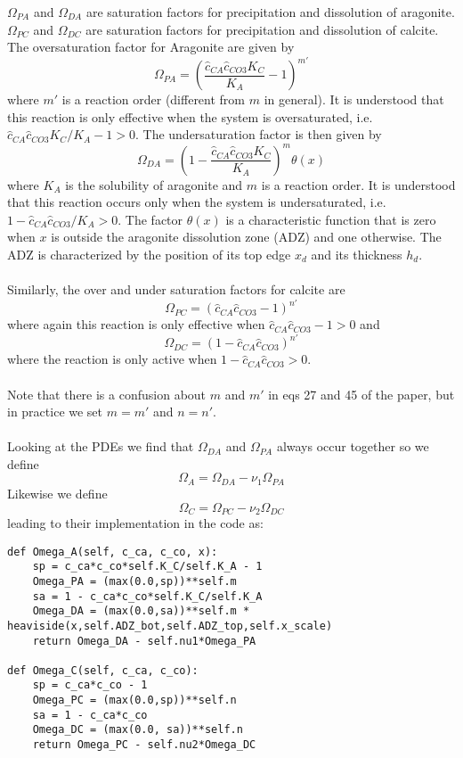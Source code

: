 \documentclass[a4paper]{article}
\begin{document}
$\Omega_{PA}$ and $\Omega_{DA}$ are saturation factors for precipitation and dissolution of aragonite. $\Omega_{PC}$ and $\Omega_{DC}$ are saturation factors for precipitation and dissolution of calcite.  The oversaturation factor for Aragonite are given by
\[
\Omega_{PA}=\left( \frac{\hat{c}_{CA} \hat{c}_{CO3} K_C}{K_A} -1 \right)^{m'}
\]
where $m'$ is a reaction order (different from $m$ in general).  It is understood that this reaction is only effective when the system is oversaturated, i.e. $\hat{c}_{CA} \hat{c}_{CO3} K_C/K_A -1 >0$.  The undersaturation factor is then given by
\[
\Omega_{DA}= \left(1-\frac{\hat{c}_{CA} \hat{c}_{CO3} K_C}{K_A}  \right)^m \theta(x)
\]
where $K_A$ is the solubility of aragonite and $m$ is a reaction order. It is understood that this reaction occurs only when the system is undersaturated, i.e. $1-\hat{c}_{CA} \hat{c}_{CO3}/K_A >0$.  The factor $\theta(x)$ is a characteristic function that is zero when $x$ is outside the aragonite dissolution zone (ADZ) and one otherwise. The ADZ is characterized by the position of its top edge $x_d$ and its thickness $h_d$.\\\\
Similarly, the over and under saturation factors for calcite are 
\[
\Omega_{PC}=\left( \hat{c}_{CA} \hat{c}_{CO3} -1 \right)^{n'}
\]
where again this reaction is only effective when $\hat{c}_{CA} \hat{c}_{CO3} -1 >0$ and 
\[
\Omega_{DC}=\left( 1- \hat{c}_{CA} \hat{c}_{CO3}\right)^{n'}
\]
where the reaction is only active when $1- \hat{c}_{CA} \hat{c}_{CO3} >0$.\\\\
Note that there is a confusion about $m$ and $m'$ in eqs 27 and 45 of the paper, but in practice we set $m=m'$ and $n=n'$.\\\\
Looking at the PDEs we find that $\Omega_{DA}$ and $\Omega_{PA}$ always occur together so we define
\[
\Omega_A=\Omega_{DA}-\nu_1\Omega_{PA} 
\]
Likewise we define
\[
\Omega_C=\Omega_{PC}-\nu_2\Omega_{DC}
\]
leading to their implementation in the code as:
\begin{lstlisting}
def Omega_A(self, c_ca, c_co, x):
    sp = c_ca*c_co*self.K_C/self.K_A - 1
    Omega_PA = (max(0.0,sp))**self.m
    sa = 1 - c_ca*c_co*self.K_C/self.K_A
    Omega_DA = (max(0.0,sa))**self.m * heaviside(x,self.ADZ_bot,self.ADZ_top,self.x_scale)
    return Omega_DA - self.nu1*Omega_PA

def Omega_C(self, c_ca, c_co):
    sp = c_ca*c_co - 1
    Omega_PC = (max(0.0,sp))**self.n
    sa = 1 - c_ca*c_co
    Omega_DC = (max(0.0, sa))**self.n
    return Omega_PC - self.nu2*Omega_DC
\end{lstlisting}
\end{document}
